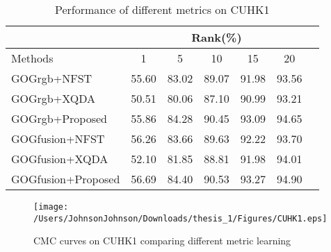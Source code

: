 \begin{table}[H]
\caption{Performance of different metrics on CUHK1}
\centering
\begin{tabular}{|l|c|c|c|c|c|c|}
\hline
& \multicolumn{5}{|c|}{Rank(\%)} \\
\hline
Methods& 1 & 5 &10&15& 20\\
\hline
GOGrgb+NFST&55.60 &83.02 &89.07 &91.98&93.56 \\ 
\hline
GOGrgb+XQDA&50.51 &80.06 &87.10 &90.99&93.21 \\ 
\hline
GOGrgb+Proposed&55.86&84.28&90.45&93.09&94.65\\  %
\hline
GOGfusion+NFST&56.26 &83.66 &89.63 &92.22&93.70 \\ 
\hline
GOGfusion+XQDA&52.10 &81.85&88.81 &91.98&94.01\\ 
\hline
GOGfusion+Proposed&56.69&84.40&90.53& 93.27&94.90\\

\hline

\end{tabular}\newline
\end{table}
\centering

\begin{figure}[H]
\texttt{[image: /Users/JohnsonJohnson/Downloads/thesis\_1/Figures/CUHK1.eps]}
\vspace{-3em}
\caption{CMC curves on CUHK1 comparing different metric learning}
\end{figure}



